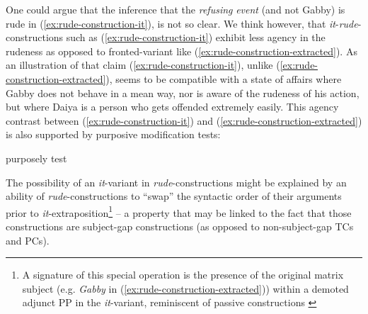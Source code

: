 \documentclass[11pt]{article}
\begin{document}
	One could argue that the inference that the \textit{refusing} \textit{event} (and not Gabby) is rude in (\ref{ex:rude-construction-it}), is not so clear. We think however, that \textit{it}-\textit{rude}-constructions such as (\ref{ex:rude-construction-it}) exhibit less agency in the rudeness as opposed to fronted-variant like (\ref{ex:rude-construction-extracted}). As an illustration of that claim (\ref{ex:rude-construction-it}), unlike (\ref{ex:rude-construction-extracted}),  seems to be compatible with a state of affairs where Gabby does not behave in a mean way, nor is aware of the rudeness of his action, but where Daiya is a person who gets offended extremely easily. This agency contrast between (\ref{ex:rude-construction-it}) and (\ref{ex:rude-construction-extracted}) is also supported by purposive modification tests:
	
purposely test

		 The possibility of an \textit{it}-variant in \textit{rude}-constructions might be explained by an ability of \textit{rude}-constructions to ``swap'' the syntactic order of their arguments prior to \textit{it}-extraposition\footnote{A signature of this special operation is the presence of the original matrix subject (e.g. \textit{Gabby} in (\ref{ex:rude-construction-extracted})) within a demoted adjunct PP in the \textit{it}-variant, reminiscent of passive constructions \cite{Bennis2004}} -- a property that may be linked to the fact that those constructions are subject-gap constructions (as opposed to non-subject-gap TCs and PCs).
		
\end{document}
